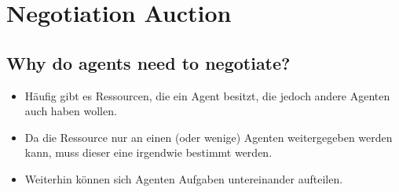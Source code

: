 \section{Negotiation Auction}
\subsection{Why do agents need to negotiate?}
\begin{itemize}
	\item Häufig gibt es Ressourcen, die ein Agent besitzt, die jedoch andere Agenten auch haben wollen.
	\item Da die Ressource nur an einen (oder wenige) Agenten weitergegeben werden kann, muss dieser eine irgendwie bestimmt werden.
	\item Weiterhin können sich Agenten Aufgaben untereinander aufteilen.
\end{itemize}
